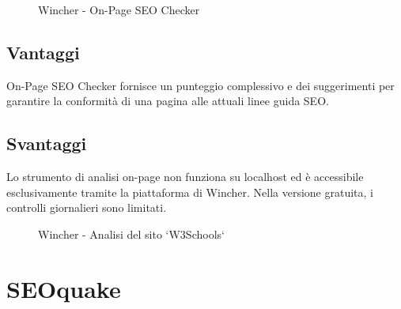 \begin{figure}[H]
    \centering 
    \caption{Wincher - On-Page SEO Checker}
\end{figure}

\subsection{Vantaggi}
\par On-Page SEO Checker fornisce un punteggio complessivo e dei suggerimenti per garantire la conformità di una pagina alle attuali linee guida SEO.

\subsection{Svantaggi}
\par Lo strumento di analisi on-page non funziona su \gls{localhost} ed è accessibile esclusivamente tramite la piattaforma di Wincher. Nella versione gratuita, i controlli giornalieri sono limitati.

\begin{figure}[H]
    \centering 
    \caption{Wincher - Analisi del sito `W3Schools`}
\end{figure}

\section{SEOquake}

